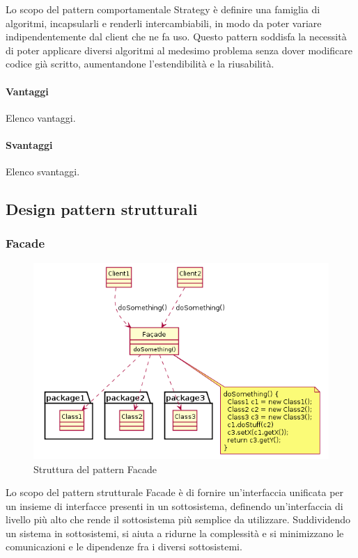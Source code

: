 \documentclass[../SpecificaTecnica.tex]{subfiles}
\begin{document}
			Lo scopo del pattern comportamentale Strategy è definire una famiglia di algoritmi, incapsularli e renderli intercambiabili, in modo da poter variare indipendentemente dal client che ne fa uso. Questo pattern soddisfa la necessità di poter applicare diversi algoritmi al medesimo problema senza dover modificare codice già scritto, aumentandone l'estendibilità e la riusabilità.
			\paragraph{Vantaggi}
				Elenco vantaggi.
			\paragraph{Svantaggi}
				Elenco svantaggi.
	\subsection{Design pattern strutturali}
		\subsubsection{Facade}
			\begin{figure}[!h]
				\centering
				\includegraphics[scale=0.5]{pattern/facade}
				\caption{Struttura del pattern Facade}
				\label{fig:Struttura_Facade}
			\end{figure}		
		
			Lo scopo del pattern strutturale Facade è di fornire un'interfaccia unificata per un insieme di interfacce presenti in un sottosistema, definendo un'interfaccia di livello più alto che rende il sottosistema più semplice da utilizzare. Suddividendo un sistema in sottosistemi, si aiuta a ridurne la complessità e si minimizzano le comunicazioni e le dipendenze fra i diversi sottosistemi.
\end{document}
